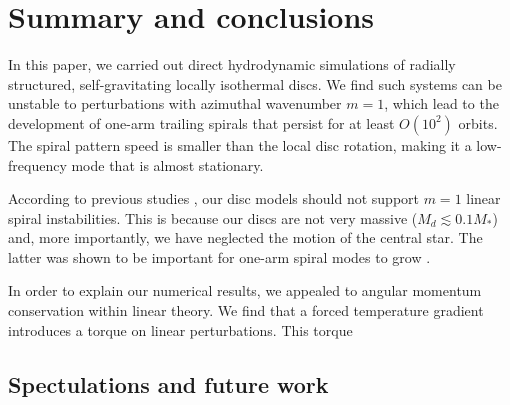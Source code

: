 \section{Summary and conclusions}\label{summary}
In this paper, we carried out direct hydrodynamic simulations of 
radially structured, self-gravitating locally isothermal discs. 
We find such systems can be unstable to perturbations with azimuthal
wavenumber $m=1$, which lead to the development of one-arm 
trailing spirals that persist for at least $O(10^2)$ orbits. The
spiral pattern speed is smaller than the local disc rotation, making
it a low-frequency mode that is almost stationary. 

According to previous studies \citep{adams89}, our disc models
should not support $m=1$ linear spiral instabilities. This is because
our discs are not very massive ($M_d\lesssim 0.1M_*$) and, more
importantly, we have neglected the motion of the central star. The 
latter was shown to be important for one-arm spiral modes to grow  
\citep{shu90}.   

In order to explain our numerical results, we appealed to  
angular momentum conservation within linear theory. We find that a  
forced temperature gradient introduces a torque on linear
perturbations. This torque  




\subsection{Spectulations and future work}


